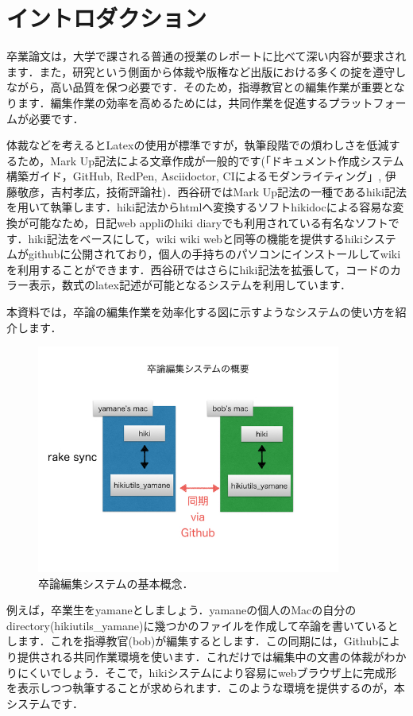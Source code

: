 
\section{イントロダクション}
卒業論文は，大学で課される普通の授業のレポートに比べて深い内容が要求されます．また，研究という側面から体裁や版権など出版における多くの掟を遵守しながら，高い品質を保つ必要です．そのため，指導教官との編集作業が重要となります．編集作業の効率を高めるためには，共同作業を促進するプラットフォームが必要です．

体裁などを考えるとLatexの使用が標準ですが，執筆段階での煩わしさを低減するため，Mark Up記法による文章作成が一般的です(「ドキュメント作成システム構築ガイド，GitHub, RedPen, Asciidoctor, CIによるモダンライティング」, 伊藤敬彦，吉村孝広，技術評論社)．西谷研ではMark Up記法の一種であるhiki記法を用いて執筆します．hiki記法からhtmlへ変換するソフトhikidocによる容易な変換が可能なため，日記web appliのhiki diaryでも利用されている有名なソフトです．hiki記法をベースにして，wiki wiki webと同等の機能を提供するhikiシステムがgithubに公開されており，個人の手持ちのパソコンにインストールしてwikiを利用することができます．西谷研ではさらにhiki記法を拡張して，コードのカラー表示，数式のlatex記述が可能となるシステムを利用しています．

本資料では，卒論の編集作業を効率化する図に示すようなシステムの使い方を紹介します．

\begin{figure}[htbp]\begin{center}
\includegraphics[width=10cm,bb= 0 0 737 553]{../figs/./hikiutils_bob.002.jpeg}
\caption{卒論編集システムの基本概念．}
\label{default}\end{center}\end{figure}
例えば，卒業生をyamaneとしましょう．yamaneの個人のMacの自分のdirectory(hikiutils\_yamane)に幾つかのファイルを作成して卒論を書いているとします．これを指導教官(bob)が編集するとします．この同期には，Githubにより提供される共同作業環境を使います．これだけでは編集中の文書の体裁がわかりにくいでしょう．そこで，hikiシステムにより容易にwebブラウザ上に完成形を表示しつつ執筆することが求められます．このような環境を提供するのが，本システムです．

